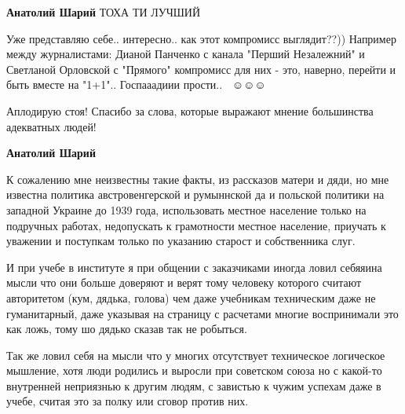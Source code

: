 \begin{itemize}
\begin{itemize}
\textbf{Анатолий Шарий} ТОХА ТИ ЛУЧШИЙ

 

Уже представляю себе.. интересно.. как этот компромисс выглядит??)) Например
между журналистами: Дианой Панченко с канала "Перший Незалежний" и Светланой
Орловской с "Прямого" компромисс для них - это, наверно, перейти и быть вместе
на "1+1".. Госпааадиии прости.. 🤭😌☺️☺️☺️🥴


 
Аплодирую стоя! Спасибо за слова, которые выражают мнение большинства адекватных людей!

 
\textbf{Анатолий Шарий} 

К сожалению мне неизвестны такие факты, из рассказов матери и дяди, но мне
известна политика австровенгерской и румыннской да и польской политики на
западной Украине до 1939 года, использовать местное население только на
подручных работах, недопускать к грамотности местное население, приучать к
уважении и поступкам только по указанию старост и собственника слуг. 

И при учебе в институте я при общении с заказчиками иногда ловил себяяина мысли
что они больше доверяют и верят тому человеку которого считают авторитетом
(кум, дядька, голова) чем даже учебникам техническим даже не гуманитарный, даже
указывая на страницу с расчетами многие воспринимали это как ложь, тому шо
дядько сказав так не робыться. 

Так же ловил себя на мысли что у многих отсутствует техническое логическое
мышление, хотя люди родились и выросли при советском союза но с какой-то
внутренней неприязнью к другим людям, с завистью к чужим успехам даже в учебе,
считая это за полку или сговор против них. 


\end{itemize}
\end{itemize}
